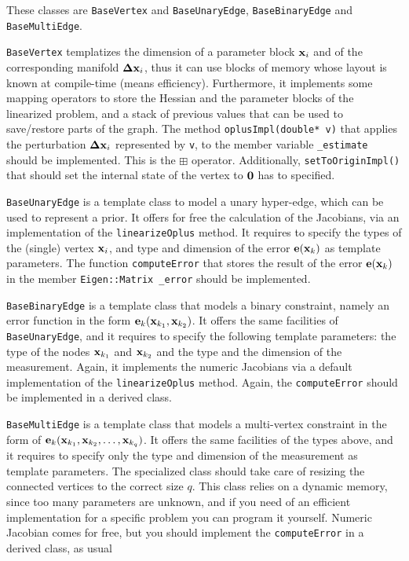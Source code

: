 \documentclass[a4paper]{article}
\begin{document}
These classes are \verb+BaseVertex+ and \verb+BaseUnaryEdge+,
\verb+BaseBinaryEdge+ and \verb+BaseMultiEdge+.
\begin{description}
\item \verb+BaseVertex+ templatizes the dimension of a parameter block
  $\mathbf{x}_i$ and of the corresponding manifold $\mathbf{\Delta x}_i$, thus it can
  use blocks of memory whose layout is known at compile-time (means
  efficiency). Furthermore, it implements some mapping operators to
  store the Hessian and the parameter blocks of the linearized
  problem, and a stack of previous values that can be used to
  save/restore parts of the graph.  The method \verb+oplusImpl(double* v)+
  that applies the perturbation $\mathbf{\Delta x}_i$ represented by \verb+v+,
  to the member variable \verb+_estimate+ should be implemented. This
  is the $\boxplus$ operator. Additionally,
  \verb+setToOriginImpl()+ that should set the internal state of the vertex
  to $\mathbf{0}$ has to specified.

\item \verb+BaseUnaryEdge+ is a template class to model a unary
  hyper-edge, which can be used to represent a prior. It offers for
  free the calculation of the Jacobians, via an implementation of the
  \verb+linearizeOplus+ method. It requires to specify the types of
  the (single) vertex $\mathbf{x}_i$, and type and dimension of the error
  $\mathbf{e}(\mathbf{x}_k)$ as template parameters.  The function
  \verb+computeError+ that stores the result of the error $\mathbf{e}(\mathbf{x}_k)$ in the
  member \verb+Eigen::Matrix _error+ should be implemented.

\item \verb+BaseBinaryEdge+ is a template class that models a binary
  constraint, namely an error function in the form $\mathbf{e}_k(\mathbf{x}_{k_1},
  \mathbf{x}_{k_2})$. It offers the same facilities of \verb+BaseUnaryEdge+, and it
  requires to specify the following template parameters: the type of the nodes
  $\mathbf{x}_{k_1}$ and $\mathbf{x}_{k_2}$  and the  type and the dimension of the measurement.
  Again, it implements the numeric Jacobians via
  a default implementation of the \verb+linearizeOplus+ method.
  Again, the \verb+computeError+ should be implemented in a derived class.

\item \verb+BaseMultiEdge+ is a template class that models a
  multi-vertex constraint in the form of $\mathbf{e}_k(\mathbf{x}_{k_1}, \mathbf{x}_{k_2},
  \ldots, \mathbf{x}_{k_q})$. It offers the same facilities of the types
  above, and it requires to specify only the type and dimension of the
  measurement as template parameters. The specialized class should
  take care of resizing the connected vertices to the correct size
  $q$.  This class relies on a dynamic memory, since too many
  parameters are unknown, and if you need of an efficient
  implementation for a specific problem you can program it yourself.
  Numeric Jacobian comes for free, but you should implement the
  \verb+computeError+ in a derived class, as usual
\end{description}
\end{document}
